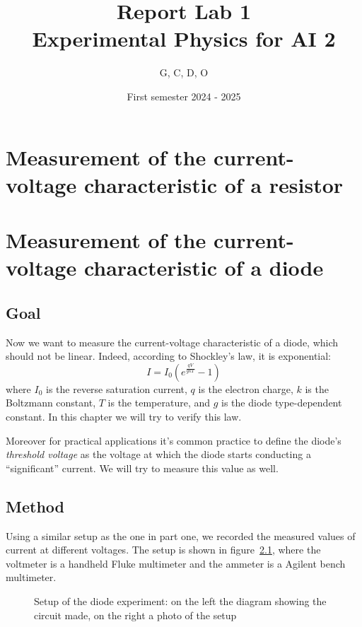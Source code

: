 

\title{Report Lab 1\\\small Experimental Physics for AI 2}
\author{G, C, D, O}
\date{First semester 2024 \-- 2025}



\maketitle

\chapter{Measurement of the current-voltage characteristic of a resistor}
\chapter{Measurement of the current-voltage characteristic of a diode}
\section{Goal}
Now we want to measure the current-voltage characteristic of a diode, which
should not be linear. Indeed, according to Shockley's law, it is exponential:
\[
    I = I_0 \left( e^{\frac{qV}{gkT}} - 1 \right)
\]
where $I_0$ is the reverse saturation current, $q$ is the electron charge, \(k\)
is the Boltzmann constant, \(T\) is the temperature, and \(g\) is the diode
type-dependent constant. In this chapter we will try to verify this law.

Moreover for practical applications it's common practice to define the diode's
\emph{threshold voltage} as the voltage at which the diode starts conducting a
``significant'' current. We will try to measure this value as well.

\section{Method}
Using a similar setup as the one in part one, we recorded the measured values of
current at different voltages. The setup is shown in
figure~\ref{fig:setup-diode}, where the voltmeter is a handheld Fluke
multimeter and the ammeter is a Agilent bench multimeter.

\begin{figure}[ht]
    \centering
    \caption{Setup of the diode experiment: on the left the diagram showing
    the circuit made, on the right a photo of the setup}\label{fig:setup-diode}
\end{figure}

